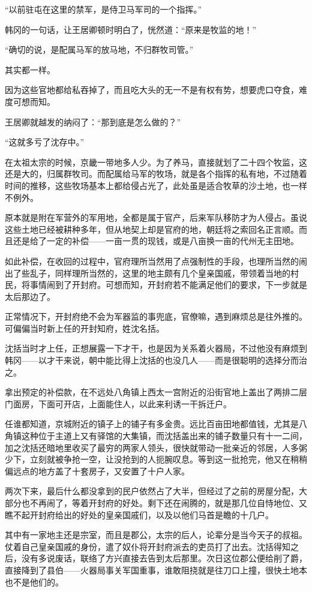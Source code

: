 “以前驻屯在这里的禁军，是侍卫马军司的一个指挥。”

韩冈的一句话，让王居卿顿时明白了，恍然道：“原来是牧监的地！”

“确切的说，是配属马军的放马地，不归群牧司管。”

其实都一样。

因为这些官地都给私吞掉了，而且吃大头的无一不是有权有势，想要虎口夺食，难度可想而知。

王居卿就越发的纳闷了：“那到底是怎么做的？”

“这就多亏了沈存中。”

在太祖太宗的时候，京畿一带地多人少。为了养马，直接就划了二十四个牧监，这还是大的，归属群牧司。而配属给马军的牧场，就是各个指挥的私有地，不过随着时间的推移，这些牧场基本上都给侵占光了，此处虽是适合牧草的沙土地，也一样不例外。

原本就是附在军营外的军用地，全都是属于官产，后来军队移防才为人侵占。虽说这些土地已经被耕种多年，但从地契上却是官府的地，朝廷将之索回名正言顺。而且还是给了一定的补偿——一亩一贯的现钱，或是八亩换一亩的代州无主田地。

如此补偿，在收回的过程中，官府理所当然用了点强制性的手段，也理所当然的闹出了些乱子，同样理所当然的，这里的地主颇有几个皇亲国戚，带领着当地的村民，将事情闹到了开封府。可想而知，开封府若不能满足他们的要求，下一步就是太后那边了。

正常情况下，开封府绝不会为军器监的事兜底，官僚嘛，遇到麻烦总是往外推的。可偏偏当时新上任的开封知府，姓沈名括。

沈括当时才上任，正想展露一下才干，也是因为关系着火器局，不过他没有麻烦到韩冈——以才干来说，朝中能比得上沈括的也没几人——而是很聪明的选择分而治之。

拿出预定的补偿款，在不远处八角镇上西太一宫附近的沿街官地上盖出了两排二层门面房，下面可开店，上面能住人，以此来利诱一干拆迁户。

任谁都知道，京城附近的镇子上的铺子有多金贵。远比百亩田地都值钱，尤其是八角镇这种位于主道上又有驿馆的大集镇，而沈括盖出来的铺子数量只有十一二间，加之沈括还暗地里收买了最穷的两家人领头，很快就带动一批亲近的邻居，人多粥少下，立刻就被争抢一空，让没抢到的人扼腕叹息。等到这一批抢完，他又在稍稍偏远点的地方盖了十套房子，又安置了十户人家。

两次下来，最后什么都没拿到的民户依然占了大半，但经过了之前的房屋分配，大部分也不再闹了，等着开封府的好处。剩下还在闹腾的，就是那几位自恃地位、又瞧不起开封府给出的好处的皇亲国戚们，以及以他们马首是瞻的十几户。

其中有一家地主还是宗室，而且是郡公，太宗的后人，论辈分是当今天子的叔祖。仗着自己皇亲国戚的身份，遣了奴仆将开封府派去的吏员打了出去。沈括得知之后，没有多说废话，联络了方兴直接去告到太后那里。次日这位郡公便给削了爵，直接降到了县伯——火器局事关军国重事，谁敢阻挠就是往刀口上撞，很快土地本也不是他们的。

